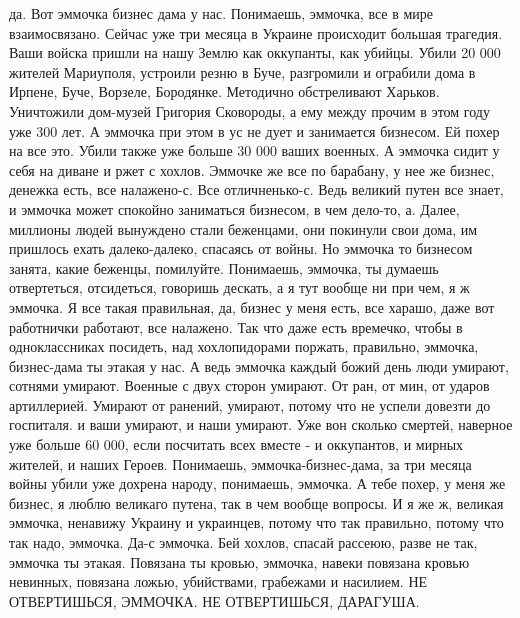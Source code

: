 да. Вот эммочка бизнес дама у нас. Понимаешь, эммочка, все в мире
взаимосвязано.  Сейчас уже три месяца в Украине происходит большая трагедия.
Ваши войска пришли на нашу Землю как оккупанты, как убийцы. Убили 20 000
жителей Мариуполя, устроили резню в Буче, разгромили и ограбили дома в Ирпене,
Буче, Ворзеле, Бородянке. Методично обстреливают Харьков. Уничтожили дом-музей
Григория Сковороды, а ему между прочим в этом году уже 300 лет. А эммочка при
этом в ус не дует и занимается бизнесом. Ей похер на все это.  Убили также уже
больше 30 000 ваших военных. А эммочка сидит у себя на диване и ржет с хохлов.
Эммочке же все по барабану, у нее же бизнес, денежка есть, все налажено-с. Все
отличненько-с. Ведь великий путен все знает, и эммочка может спокойно
заниматься бизнесом, в чем дело-то, а. Далее, миллионы людей вынуждено стали
беженцами, они покинули свои  дома, им пришлось ехать далеко-далеко, спасаясь
от войны. Но эммочка то бизнесом занята, какие беженцы, помилуйте.  Понимаешь,
эммочка, ты думаешь отвертеться, отсидеться, говоришь дескать, а я тут вообще
ни при чем, я ж эммочка. Я все такая правильная, да, бизнес у меня есть, все
харашо, даже вот работнички работают, все налажено. Так что даже есть времечко,
чтобы в одноклассниках посидеть, над хохлопидорами поржать, правильно, эммочка,
бизнес-дама ты этакая у нас.  А ведь эммочка каждый божий день люди умирают,
сотнями умирают. Военные с двух сторон умирают. От ран, от мин, от ударов
артиллерией. Умирают от ранений, умирают, потому что не успели довезти до
госпиталя.  и ваши умирают, и наши умирают. Уже вон сколько смертей, наверное
уже больше 60 000, если посчитать всех вместе - и оккупантов, и мирных жителей,
и наших Героев. Понимаешь, эммочка-бизнес-дама, за три месяца войны убили уже
дохрена народу, понимаешь, эммочка.  А тебе похер, у меня же бизнес, я люблю
великаго путена, так в чем вообще вопросы. И я же ж, великая эммочка, ненавижу
Украину и украинцев, потому что так правильно, потому что так надо, эммочка.
Да-с эммочка. Бей хохлов, спасай рассеюю, разве не так, эммочка ты этакая.
Повязана ты кровью, эммочка, навеки повязана кровью невинных, повязана ложью,
убийствами, грабежами и насилием. НЕ ОТВЕРТИШЬСЯ, ЭММОЧКА. НЕ ОТВЕРТИШЬСЯ,
ДАРАГУША.

